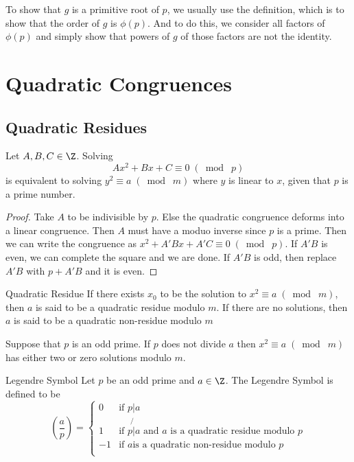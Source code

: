To show that $g$ is a primitive root of $p$, we usually use the definition, which is to show that the order of $g$ is $\phi(p)$. And to do this, we consider all factors of $\phi(p)$ and simply show that powers of $g$ of those factors are not the identity. 

\pagebreak
\section{Quadratic Congruences}
\subsection{Quadratic Residues}
\begin{prp}{}{} Let $A,B,C\in\Z$. Solving $$Ax^2+Bx+C\equiv0\;(\bmod\; p)$$ is equivalent to solving $y^2\equiv a\;(\bmod\; m)$ where $y$ is linear to $x$, given that $p$ is a prime number. \tcbline
\begin{proof}
Take $A$ to be indivisible by $p$. Else the quadratic congruence deforms into a linear congruence. Then $A$ must have a moduo inverse since $p$ is a prime. Then we can write the congruence as $x^2+A'Bx+A'C\equiv 0\;(\bmod\; p)$. If $A'B$ is even, we can complete the square and we are done. If $A'B$ is odd, then replace $A'B$ with $p+A'B$ and it is even. 
\end{proof}
\end{prp}

\begin{defn}{Quadratic Residue}{} If there exists $x_0$ to be the solution to $x^2\equiv a\;(\bmod\; m)$, then $a$ is said to be a quadratic residue modulo $m$. If there are no solutions, then $a$ is said to be a quadratic non-residue modulo $m$
\end{defn}

\begin{prp}{}{} Suppose that $p$ is an odd prime. If $p$ does not divide $a$ then $x^2\equiv a\;(\bmod\; m)$ has either two or zero solutions modulo $m$. 
\end{prp}

\begin{defn}{Legendre Symbol}{} Let $p$ be an odd prime and $a\in\Z$. The Legendre Symbol is defined to be $$\left(\frac{a}{p}\right)=\begin{cases}
0 & \text{if }p|a\\
1 & \text{if }p\not{|}a \text{ and $a$ is a quadratic residue modulo }p\\
-1 & \text{if }a \text{is a quadratic non-residue modulo }p\\
\end{cases}$$
\end{defn}

